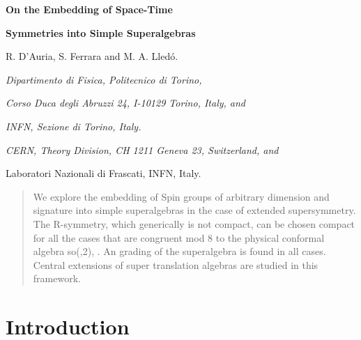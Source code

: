 \documentclass[a4paper,12pt]{article}
\begin{document}
\providecommand{\Z}{\mathbb{Z}}
\providecommand{\R}{\mathbb{R}}
\providecommand{\C}{\mathbb{C}}
\providecommand{\g}{\mathcal{G}}
\providecommand{\s}{\mathcal{S}}
\providecommand{\ka}{\mathcal{K}}
\providecommand{\p}{\mathcal{P}}
\providecommand{\A}{\mathcal{A}}
\providecommand{\I}{\mathcal{I}}
\providecommand{\Ca}{\mathcal{C}}
\providecommand{\N}{\mathbb{N}}
\providecommand{\La}{\mathcal{L}}
\providecommand{\Ha}{\mathbb{H}}

\vskip 2cm


  \centerline{\LARGE \bf On the Embedding of Space-Time }

  \smallskip

\centerline{\LARGE \bf Symmetries into Simple Superalgebras}
\vskip 3cm \centerline{ R. D'Auria\myHighlight{$^\dagger$}\coordHE{}, S. Ferrara\myHighlight{$^\star$}\coordHE{}
and M. A. Lled\'o\myHighlight{$^\dagger$}\coordHE{}.}

\vskip 2cm


\centerline{\it \myHighlight{$^\dagger$}\coordHE{} Dipartimento di Fisica, Politecnico di
Torino,} \centerline{\it Corso Duca degli Abruzzi 24, I-10129
Torino, Italy, and} \centerline{\it INFN, Sezione di Torino,
Italy.}
 \medskip

\centerline{\it \myHighlight{$^\star$}\coordHE{} CERN, Theory Division, CH 1211 Geneva 23,
Switzerland, and } \centerline{Laboratori Nazionali di Frascati,
INFN, Italy.}



\vskip 2cm

\begin{abstract}
We explore the embedding of Spin groups of arbitrary dimension and
signature into simple superalgebras in the case of extended
supersymmetry. The R-symmetry, which generically is not compact,
can be chosen compact for all the cases that are congruent mod 8
to the physical conformal algebra so(\coordHE{},2), \coordHE{}. An
\coordHE{} grading of the superalgebra is found in all cases.
Central extensions of super translation algebras are studied in
this framework.



\end{abstract}

\vfill\eject

\section{Introduction}
\end{document}
